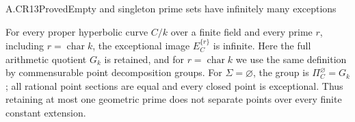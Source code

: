 \begin{claim}{A.CR13}{Proved}{Empty and singleton prime sets have infinitely many exceptions}

For every proper hyperbolic curve $C/k$ over a finite field and every
prime $r$, including $r=\operatorname{char}k$, the exceptional
image $E_C^{\{r\}}$ is infinite. Here the full arithmetic quotient
$G_k$ is retained, and for $r=\operatorname{char}k$ we use the
same definition by commensurable point decomposition groups.
For $\Sigma=\varnothing$, the group is $\Pi_C^\varnothing=G_k$;
all rational point sections are equal and every closed point is
exceptional. Thus retaining at most one geometric prime does not
separate points over every finite constant extension.

\end{claim}

